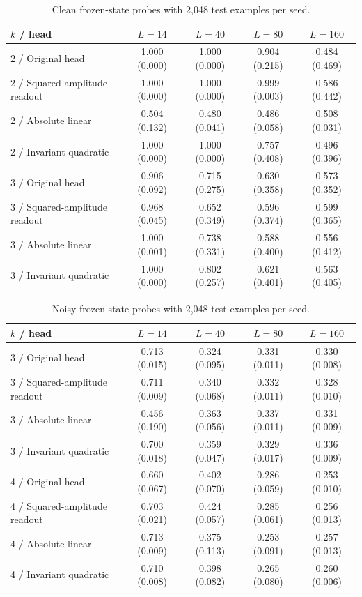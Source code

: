 \begin{table}[tbp]
\centering\small
\caption{Clean frozen-state probes with 2,048 test examples per seed.}
\label{tab:newfrozenclean}
\setlength{\tabcolsep}{3pt}
\begin{tabular}{lcccc}
\toprule
$k$ / head & $L=14$ & $L=40$ & $L=80$ & $L=160$ \\
\midrule
2 / Original head & 1.000 (0.000) & 1.000 (0.000) & 0.904 (0.215) & 0.484 (0.469) \\
2 / Squared-amplitude readout & 1.000 (0.000) & 1.000 (0.000) & 0.999 (0.003) & 0.586 (0.442) \\
2 / Absolute linear & 0.504 (0.132) & 0.480 (0.041) & 0.486 (0.058) & 0.508 (0.031) \\
2 / Invariant quadratic & 1.000 (0.000) & 1.000 (0.000) & 0.757 (0.408) & 0.496 (0.396) \\
3 / Original head & 0.906 (0.092) & 0.715 (0.275) & 0.630 (0.358) & 0.573 (0.352) \\
3 / Squared-amplitude readout & 0.968 (0.045) & 0.652 (0.349) & 0.596 (0.374) & 0.599 (0.365) \\
3 / Absolute linear & 1.000 (0.001) & 0.738 (0.331) & 0.588 (0.400) & 0.556 (0.412) \\
3 / Invariant quadratic & 1.000 (0.000) & 0.802 (0.257) & 0.621 (0.401) & 0.563 (0.405) \\
\bottomrule
\end{tabular}
\end{table}

\begin{table}[tbp]
\centering\small
\caption{Noisy frozen-state probes with 2,048 test examples per seed.}
\label{tab:newfrozen}
\setlength{\tabcolsep}{3pt}
\begin{tabular}{lcccc}
\toprule
$k$ / head & $L=14$ & $L=40$ & $L=80$ & $L=160$ \\
\midrule
3 / Original head & 0.713 (0.015) & 0.324 (0.095) & 0.331 (0.011) & 0.330 (0.008) \\
3 / Squared-amplitude readout & 0.711 (0.009) & 0.340 (0.068) & 0.332 (0.011) & 0.328 (0.010) \\
3 / Absolute linear & 0.456 (0.190) & 0.363 (0.056) & 0.337 (0.011) & 0.331 (0.009) \\
3 / Invariant quadratic & 0.700 (0.018) & 0.359 (0.047) & 0.329 (0.017) & 0.336 (0.009) \\
4 / Original head & 0.660 (0.067) & 0.402 (0.070) & 0.286 (0.059) & 0.253 (0.010) \\
4 / Squared-amplitude readout & 0.703 (0.021) & 0.424 (0.057) & 0.285 (0.061) & 0.256 (0.013) \\
4 / Absolute linear & 0.713 (0.009) & 0.375 (0.113) & 0.253 (0.091) & 0.257 (0.013) \\
4 / Invariant quadratic & 0.710 (0.008) & 0.398 (0.082) & 0.265 (0.080) & 0.260 (0.006) \\
\bottomrule
\end{tabular}
\end{table}

